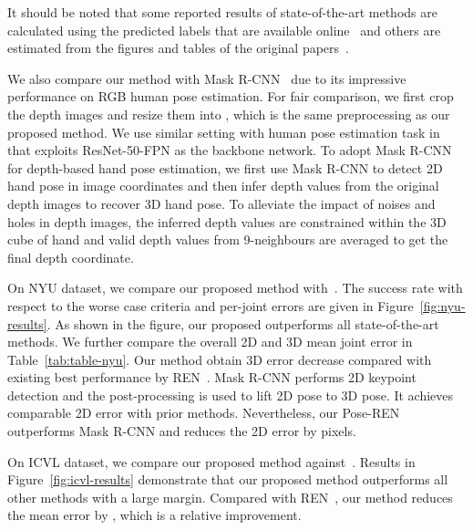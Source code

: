 \documentclass[final, 5p]{elsarticle}
\begin{document}
It should be noted that some reported results of state-of-the-art methods are calculated using the predicted labels that are available online~\cite{tang2014latent, oberweger2015training, zhou2016model, guo2017region, Xu2017, wang2018region} and others are estimated from the figures and tables of the original papers~\cite{sun2015cascaded, wan2016hand, ge2016robust, ge2017threedcnn, wan2017crossing, madadi2017occlusion, madadi2017end}.

We also compare our method with Mask R-CNN~\cite{he2017mask} due to its impressive performance on RGB human pose estimation. For fair comparison, we first crop the depth images and resize them into , which is the same preprocessing as our proposed method. We use similar setting with human pose estimation task in~\cite{he2017mask} that exploits ResNet-50-FPN as the backbone network. To adopt Mask R-CNN for depth-based hand pose estimation, we first use Mask R-CNN to detect 2D hand pose in image coordinates and then infer depth values from the original depth images to recover 3D hand pose. To alleviate the impact of noises and holes in depth images, the inferred depth values are constrained within the 3D cube of hand and valid depth values from 9-neighbours are averaged to get the final depth coordinate.

On NYU dataset, we compare our proposed method with~\cite{oberweger2015hands, oberweger2015training, zhou2016model, sinha2016deephand, Xu2017, wan2017crossing, ge2016robust, ge2017threedcnn, wang2018region, he2017mask}. The success rate with respect to the worse case criteria and per-joint errors are given in Figure~\ref{fig:nyu-results}. As shown in the figure, our proposed outperforms all state-of-the-art methods. We further compare the overall 2D and 3D mean joint error in Table~\ref{tab:table-nyu}. Our method obtain  3D error decrease compared with existing best performance by REN~\cite{wang2018region}.
Mask R-CNN performs 2D keypoint detection and the post-processing is used to lift 2D pose to 3D pose. It achieves comparable 2D error with prior methods. Nevertheless, our Pose-REN outperforms Mask R-CNN and reduces the 2D error by  pixels.

On ICVL dataset, we compare our proposed method against~\cite{tang2014latent, zhou2016model, oberweger2015hands, wan2017crossing, wan2016hand, wang2018region}. Results in Figure~\ref{fig:icvl-results} demonstrate that our proposed method outperforms all other methods with a large margin. Compared with REN~\cite{wang2018region}, our method reduces the mean error by , which is a  relative improvement.
\end{document}

